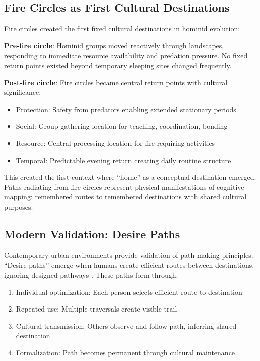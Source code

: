 \documentclass[12pt,a4paper]{article}
\begin{document}
\subsection{Fire Circles as First Cultural Destinations}

Fire circles created the first fixed cultural destinations in hominid evolution:

\textbf{Pre-fire circle}: Hominid groups moved reactively through landscapes, responding to immediate resource availability and predation pressure. No fixed return points existed beyond temporary sleeping sites changed frequently.

\textbf{Post-fire circle}: Fire circles became central return points with cultural significance:
\begin{itemize}
\item Protection: Safety from predators enabling extended stationary periods
\item Social: Group gathering location for teaching, coordination, bonding
\item Resource: Central processing location for fire-requiring activities
\item Temporal: Predictable evening return creating daily routine structure
\end{itemize}

This created the first context where ``home'' as a conceptual destination emerged. Paths radiating from fire circles represent physical manifestations of cognitive mapping: remembered routes to remembered destinations with shared cultural purposes.

\subsection{Modern Validation: Desire Paths}

Contemporary urban environments provide validation of path-making principles. ``Desire paths'' emerge when humans create efficient routes between destinations, ignoring designed pathways \citep{helbing1997modelling}. These paths form through:

\begin{enumerate}
\item Individual optimization: Each person selects efficient route to destination
\item Repeated use: Multiple traversals create visible trail
\item Cultural transmission: Others observe and follow path, inferring shared destination
\item Formalization: Path becomes permanent through cultural maintenance
\end{enumerate}
\end{document}
